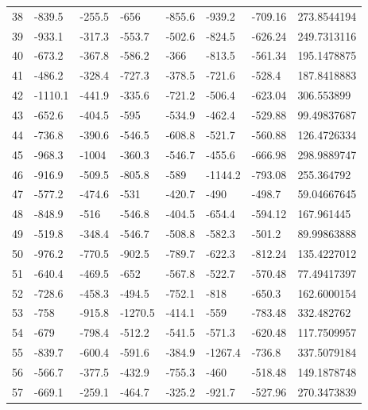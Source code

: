 \begin{table}[h]
\begin{tabular}{llllllll}
38      & -839.5  & -255.5  & -656    & -855.6  & -939.2  & -709.16  & 273.8544194        \\
39      & -933.1  & -317.3  & -553.7  & -502.6  & -824.5  & -626.24  & 249.7313116        \\
40      & -673.2  & -367.8  & -586.2  & -366    & -813.5  & -561.34  & 195.1478875        \\
41      & -486.2  & -328.4  & -727.3  & -378.5  & -721.6  & -528.4   & 187.8418883        \\
42      & -1110.1 & -441.9  & -335.6  & -721.2  & -506.4  & -623.04  & 306.553899         \\
43      & -652.6  & -404.5  & -595    & -534.9  & -462.4  & -529.88  & 99.49837687        \\
44      & -736.8  & -390.6  & -546.5  & -608.8  & -521.7  & -560.88  & 126.4726334        \\
45      & -968.3  & -1004   & -360.3  & -546.7  & -455.6  & -666.98  & 298.9889747        \\
46      & -916.9  & -509.5  & -805.8  & -589    & -1144.2 & -793.08  & 255.364792         \\
47      & -577.2  & -474.6  & -531    & -420.7  & -490    & -498.7   & 59.04667645        \\
48      & -848.9  & -516    & -546.8  & -404.5  & -654.4  & -594.12  & 167.961445         \\
49      & -519.8  & -348.4  & -546.7  & -508.8  & -582.3  & -501.2   & 89.99863888        \\
50      & -976.2  & -770.5  & -902.5  & -789.7  & -622.3  & -812.24  & 135.4227012        \\
51      & -640.4  & -469.5  & -652    & -567.8  & -522.7  & -570.48  & 77.49417397        \\
52      & -728.6  & -458.3  & -494.5  & -752.1  & -818    & -650.3   & 162.6000154        \\
53      & -758    & -915.8  & -1270.5 & -414.1  & -559    & -783.48  & 332.482762         \\
54      & -679    & -798.4  & -512.2  & -541.5  & -571.3  & -620.48  & 117.7509957        \\
55      & -839.7  & -600.4  & -591.6  & -384.9  & -1267.4 & -736.8   & 337.5079184        \\
56      & -566.7  & -377.5  & -432.9  & -755.3  & -460    & -518.48  & 149.1878748        \\
57      & -669.1  & -259.1  & -464.7  & -325.2  & -921.7  & -527.96  & 270.3473839        \\

\end{tabular}
\end{table}
